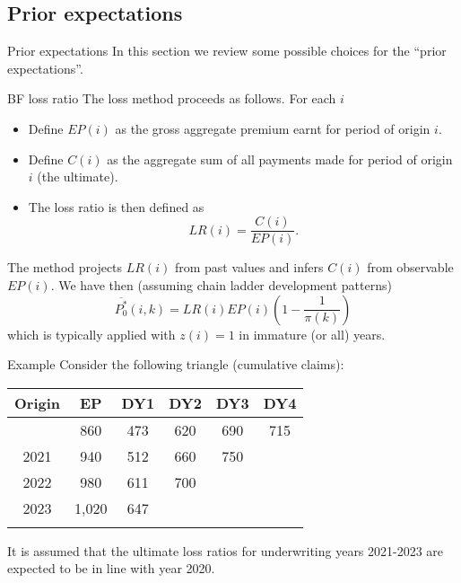 \documentclass[
  ignorenonframetext,
  t,handout]{beamer}
\providecommand{\tightlist}{%
  \setlength{\itemsep}{0pt}\setlength{\parskip}{0pt}}
\begin{document}
\subsection{Prior expectations}\label{prior-expectations}

\begin{frame}{Prior expectations}
In this section we review some possible choices for the ``prior
expectations''.
\end{frame}

\begin{frame}{BF loss ratio}
\label{bf-loss-ratio}
The loss method proceeds as follows. For each \(i\)

\begin{itemize}
\tightlist
\item
  Define \(EP(i)\) as the gross aggregate premium earnt for period of
  origin \(i\).
\item
  Define \(C(i)\) as the aggregate sum of all payments made for period
  of origin \(i\) (the ultimate).
\item
  The loss ratio is then defined as \[ LR(i) = \frac{C(i)}{EP(i)}.\]
\end{itemize}

The method projects \(LR(i)\) from past values and infers \(C(i)\) from
observable \(EP(i)\). We have then (assuming chain ladder development
patterns)
\[\overline{P_0^*}(i,k) = LR(i)EP(i)\left( 1-\frac{1}{\pi(k)}\right)\]
which is typically applied with \(z(i)=1\) in immature (or all) years.
\end{frame}

\begin{frame}{Example}
\label{example}
Consider the following triangle (cumulative claims):

\begin{longtable}[]{@{}cccccc@{}}
\toprule\noalign{}
Origin & EP & DY1 & DY2 & DY3 & DY4 \\
\midrule\noalign{}
\endhead
2020 & 860 & 473 & 620 & 690 & 715 \\
2021 & 940 & 512 & 660 & 750 & \\
2022 & 980 & 611 & 700 & & \\
2023 & 1,020 & 647 & & & \\
\bottomrule\noalign{}
\end{longtable}

It is assumed that the ultimate loss ratios for underwriting years
2021-2023 are expected to be in line with year 2020.
\end{frame}
\end{document}
